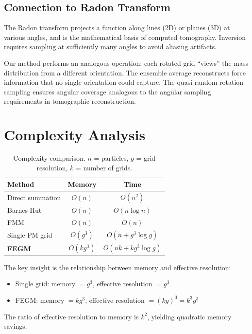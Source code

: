 \documentclass[11pt,twocolumn]{article}
\begin{document}
\subsection{Connection to Radon Transform}

The Radon transform projects a function along lines (2D) or planes (3D) at various angles, and is the mathematical basis of computed tomography. Inversion requires sampling at sufficiently many angles to avoid aliasing artifacts.

Our method performs an analogous operation: each rotated grid ``views'' the mass distribution from a different orientation. The ensemble average reconstructs force information that no single orientation could capture. The quasi-random rotation sampling ensures angular coverage analogous to the angular sampling requirements in tomographic reconstruction.

\section{Complexity Analysis}

\begin{table}[h]
\centering
\begin{tabular}{lcc}
\toprule
Method & Memory & Time \\
\midrule
Direct summation & $O(n)$ & $O(n^2)$ \\
Barnes-Hut & $O(n)$ & $O(n \log n)$ \\
FMM & $O(n)$ & $O(n)$ \\
Single PM grid & $O(g^3)$ & $O(n + g^3 \log g)$ \\
\textbf{FEGM} & $O(kg^3)$ & $O(nk + kg^3 \log g)$ \\
\bottomrule
\end{tabular}
\caption{Complexity comparison. $n$ = particles, $g$ = grid resolution, $k$ = number of grids.}
\label{tab:complexity}
\end{table}

The key insight is the relationship between memory and effective resolution:
\begin{itemize}
    \item Single grid: memory $= g^3$, effective resolution $= g^3$
    \item FEGM: memory $= kg^3$, effective resolution $= (kg)^3 = k^3 g^3$
\end{itemize}

The ratio of effective resolution to memory is $k^2$, yielding quadratic memory savings.
\end{document}
